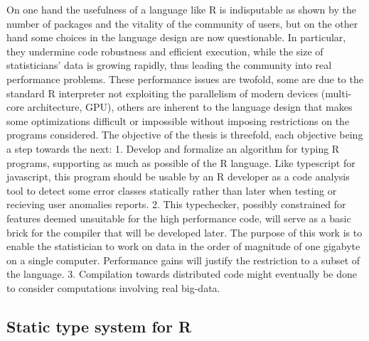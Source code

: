 On one hand the usefulness of a language like R is indisputable as shown by the number of packages and the vitality of the community of users, but on the other hand some choices in the language design are now questionable. In particular, they undermine code robustness and efficient execution, while the size of statisticians' data is growing rapidly, thus leading the community into real performance problems. These performance issues are twofold, some are due to the standard R interpreter not exploiting the parallelism of modern devices (multi-core architecture, GPU), others are inherent to the language design that makes some optimizations difficult or impossible without imposing restrictions on the programs considered.
The objective of the thesis is threefold, each objective being a step towards the next:
1. Develop and formalize an algorithm for typing R programs, supporting as much as possible of the R language. Like typescript for javascript, this program should be usable by an R developer as a code analysis tool to detect some error classes statically rather than later when testing or recieving user anomalies reports.
2. This typechecker, possibly constrained for features deemed unsuitable for the high performance code, will serve as a basic brick for the compiler that will be developed later. The purpose of this work is to enable the statistician to work on data in the order of magnitude of one gigabyte on a single computer. Performance gains will justify the restriction to a subset of the language.
3. Compilation towards distributed code might eventually be done to consider computations involving real big-data.\\

\subsection{Static type system for R}


